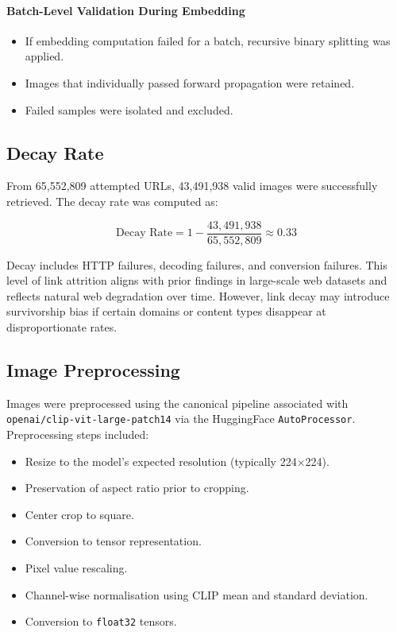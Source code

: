 \paragraph{Batch-Level Validation During Embedding}
\begin{itemize}
	\item If embedding computation failed for a batch, recursive binary splitting was applied.
	\item Images that individually passed forward propagation were retained.
	\item Failed samples were isolated and excluded.
\end{itemize}

\subsection{Decay Rate}

From 65,552,809 attempted URLs, 43,491,938 valid images were successfully retrieved. The decay rate was computed as:

\[
\text{Decay Rate} = 1 - \frac{43,491,938}{65,552,809} \approx 0.33
\]

Decay includes HTTP failures, decoding failures, and conversion failures. This level of link attrition aligns with prior findings in large-scale web datasets and reflects natural web degradation over time. However, link decay may introduce survivorship bias if certain domains or content types disappear at disproportionate rates.

\subsection{Image Preprocessing}

Images were preprocessed using the canonical pipeline associated with \texttt{openai/clip-vit-large-patch14} via the HuggingFace \texttt{AutoProcessor}. Preprocessing steps included:

\begin{itemize}
	\item Resize to the model's expected resolution (typically 224$\times$224).
	\item Preservation of aspect ratio prior to cropping.
	\item Center crop to square.
	\item Conversion to tensor representation.
	\item Pixel value rescaling.
	\item Channel-wise normalisation using CLIP mean and standard deviation.
	\item Conversion to \texttt{float32} tensors.
\end{itemize}

